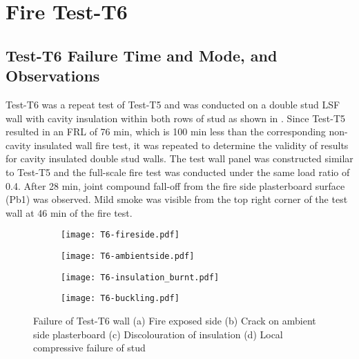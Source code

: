 \section{Fire Test-T6}
\subsection{Test-T6 Failure Time and Mode, and Observations}

Test-T6 was a repeat test of Test-T5 and was conducted on a double stud LSF wall with cavity insulation within both rows of stud as shown in . Since Test-T5 resulted in an FRL of 76 min, which is 100 min less than the corresponding non-cavity insulated wall fire test, it was repeated to determine the validity of results for cavity insulated double stud walls. The test wall panel was constructed similar to Test-T5 and the full-scale fire test was conducted under the same load ratio of 0.4. After 28 min, joint compound fall-off from the fire side plasterboard surface (Pb1) was observed. Mild smoke was visible from the top right corner of the test wall at 46 min of the fire test. 
\begin{figure}[!htbp]
	\centering
	\begin{subfigure}[b]{0.35\textwidth}
		\centering
		\texttt{[image: T6-fireside.pdf]}
		\caption{}
		\label{subfig:T6-fireside}
	\end{subfigure}
	\begin{subfigure}[b]{0.35\textwidth}
		\centering
		\texttt{[image: T6-ambientside.pdf]}
		\caption{}
		\label{subfig:T6-ambientside}
	\end{subfigure}
	\begin{subfigure}[b]{0.35\textwidth}
		\centering
		\texttt{[image: T6-insulation\_burnt.pdf]}
		\caption{}
		\label{subfig:T6-insulation_burnt}
	\end{subfigure}
	\begin{subfigure}[b]{0.35\textwidth}
		\centering
		\texttt{[image: T6-buckling.pdf]}
		\caption{}
		\label{subfig:T6-buckling}
	\end{subfigure}
	   \caption{Failure of Test-T6 wall (a) Fire exposed side (b) Crack on ambient side plasterboard (c) Discolouration of insulation (d) Local compressive failure of stud}
	   \label{fig:T6-failure}
\end{figure}

